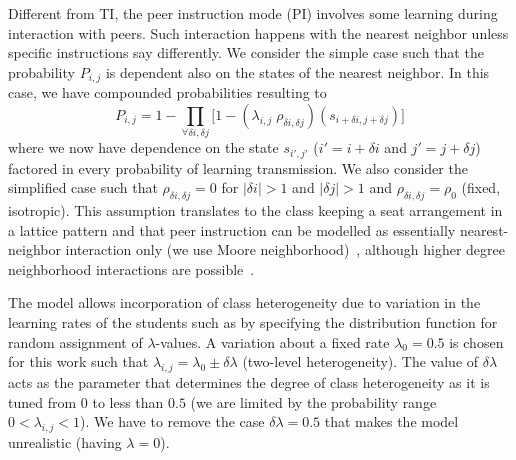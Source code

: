 \documentclass[twocolumn,secnumarabic,amssymb, nobibnotes, aps, prd]{revtex4-2}
\begin{document}

    Different from TI, the peer instruction mode (PI) involves some learning during interaction with peers.
    Such interaction happens with the nearest neighbor unless specific instructions say differently.
    We consider the simple case such that the probability $P_{i,j}$ is dependent also on the states of the nearest neighbor.
    In this case, we have compounded probabilities resulting to
    \begin{equation} 
        \label{eq:BPCA PI learning probability}
            P_{i,j} = 1 - \prod_{\forall \delta i, \delta j}{\lbrack
                1-(\lambda_{i,j}\;\rho_{\delta i, \delta j})(s_{i+\delta i, j+\delta j})}
            \rbrack
    \end{equation}
    where we now have dependence on the state
    $s_{i',j'}$ ($i'=i+\delta i$ and $j'=j+\delta j$) factored in every probability of learning transmission.
    We also consider the simplified case such that $\rho_{\delta i, \delta j} = 0$ 
    for $|\delta i| > 1$ and $|\delta j| > 1$ and $\rho_{\delta i,\delta j}=\rho_0$ (fixed, isotropic).
    This assumption translates to the class keeping a seat arrangement in a lattice pattern and that peer instruction can be modelled as essentially nearest-neighbor interaction only (we use Moore neighborhood)~\cite{kari2005catheory, zaitsev2017generalized,louis2018probabilistic}, although higher degree neighborhood interactions are possible~\cite{dong2021influence}.

    The model allows incorporation of class heterogeneity due to variation in the learning rates of the students such as by specifying the distribution function for random assignment of $\lambda$-values.
    A variation about a fixed rate $\lambda_0=0.5$ is chosen for this work such that $\lambda_{i,j}=\lambda_0 \pm \delta\!\lambda$ (two-level heterogeneity).
    The value of $\delta\!\lambda$ acts as the parameter that determines the degree of class heterogeneity as it is tuned from $0$ to less than $0.5$ (we are limited by the probability range ${0}<\lambda_{i,j}<{1}$).
    We have to remove the case $\delta\!\lambda=0.5$ that makes the model unrealistic (having $\lambda=0$).
\end{document}
